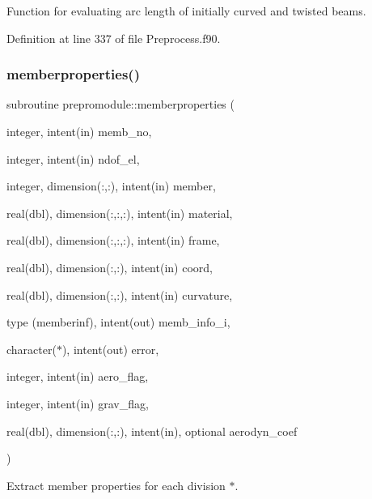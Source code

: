 Function for evaluating arc length of initially curved and twisted beams. 



Definition at line 337 of file Preprocess.\+f90.

\mbox{\label{namespaceprepromodule_a2011e4ceff94f407d454a10cc186d45b}} 
\subsubsection{\texorpdfstring{memberproperties()}{memberproperties()}}
{\footnotesize\ttfamily subroutine prepromodule\+::memberproperties (\begin{DoxyParamCaption}\item[{integer, intent(in)}]{memb\+\_\+no,  }\item[{integer, intent(in)}]{ndof\+\_\+el,  }\item[{integer, dimension(\+:,\+:), intent(in)}]{member,  }\item[{real(dbl), dimension(\+:,\+:,\+:), intent(in)}]{material,  }\item[{real(dbl), dimension(\+:,\+:,\+:), intent(in)}]{frame,  }\item[{real(dbl), dimension(\+:,\+:), intent(in)}]{coord,  }\item[{real(dbl), dimension(\+:,\+:), intent(in)}]{curvature,  }\item[{type (memberinf), intent(out)}]{memb\+\_\+info\+\_\+i,  }\item[{character($\ast$), intent(out)}]{error,  }\item[{integer, intent(in)}]{aero\+\_\+flag,  }\item[{integer, intent(in)}]{grav\+\_\+flag,  }\item[{real(dbl), dimension(\+:,\+:), intent(in), optional}]{aerodyn\+\_\+coef }\end{DoxyParamCaption})\hspace{0.3cm}{\ttfamily [private]}}



Extract member properties for each division $\ast$. 


